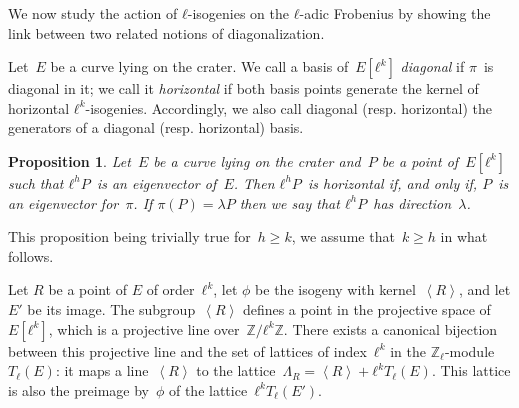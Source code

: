 \documentclass{lms}
\newtheorem{prop}[thm]{Proposition}
\def\chev#1{\left\langle#1\right\rangle}
\begin{document}
We now study the action of $ℓ$-isogenies on the $ℓ$-adic Frobenius by
showing the link between two related notions of diagonalization.

\begin{defi}
  Let~$E$ be a curve lying on the crater. We call a
  basis of~$E[ℓ^k]$ \emph{diagonal} if $π$~is diagonal in it; we call
  it \emph{horizontal} if both basis points generate the kernel of
  horizontal $ℓ^k$-isogenies. Accordingly, we also call diagonal
  (resp. horizontal) the generators of a diagonal (resp. horizontal)
  basis.
\end{defi}

\begin{prop} \label{prop:diagonal-horizontal}
Let~$E$ be a curve lying on the crater and~$P$ be a point of~$E[ℓ^k]$
such that $ℓ^h P$~is an eigenvector of~$E$.
Then $ℓ^h P$~is horizontal if, and only if, $P$~is an eigenvector for~$π$.
If $π(P) = λ P$ then we say that $ℓ^h P$~has direction~$λ$.
\end{prop}

This proposition being trivially true for~$h ≥ k$,
we assume that~$k ≥ h$ in what follows.

Let $R$ be a point of $E$ of order~$ℓ^k$, let $ϕ$ be the isogeny 
with kernel~$\chev{R}$, and let $E'$ be its image. The subgroup~$\chev{R}$ defines a point in
the projective space of~$E[ℓ^k]$,
which is a projective line over~$ℤ/ℓ^k ℤ$.
There exists a canonical bijection~\cite[II.1.1]{SL2} between
this projective line and
the set of lattices of index~$ℓ^k$ in the $ℤ_ℓ$-module $T_ℓ(E)$:
it maps a line~$\chev{R}$ to the lattice~$Λ_R = \chev{R} + ℓ^k T_ℓ(E)$.
This lattice is also the preimage by~$ϕ$
of the lattice~$ℓ^k T_ℓ(E')$.
\end{document}
